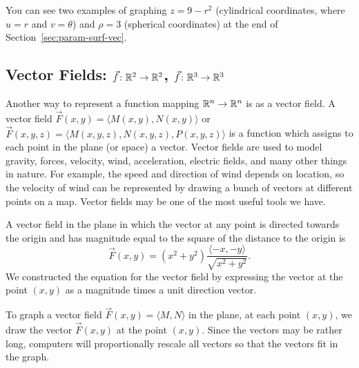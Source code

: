 You can see two examples of graphing $z=9-r^2$ (cylindrical
coordinates, where $u=r$ and $v=\theta$) and $\rho=3$ (spherical
coordinates) at the end of Section~\ref{sec:param-surf-vec}.

\subsection{Vector Fields: {$\vec f\colon \mathbb{R}^2\to \mathbb{R}^2$}, {$\vec f\colon \mathbb{R}^3\to \mathbb{R}^3$}}
Another way to represent a function mapping $\mathbb{R}^n\to\mathbb{R}^n$ is as a
vector field.  A vector field $\vec F(x,y) = \langle
M(x,y),N(x,y)\rangle$ or $\vec F(x,y,z) = \langle
M(x,y,z),N(x,y,z),P(x,y,z) \rangle$ is a function which assigns to
each point in the plane (or space) a vector.  Vector fields are used
to model gravity, forces, velocity, wind, acceleration, electric
fields, and many other things in nature. For example, the speed and
direction of wind depends on location, so the velocity of wind can be
represented by drawing a bunch of vectors at different points on a
map.  Vector fields may be one of the most useful tools we have.

\begin{example} 
A vector field in the plane in which the vector at any
point is directed towards the origin and has magnitude equal to the
square of the distance to the origin is
$$\vec F(x,y) =
(x^2+y^2)\frac{\langle-x,-y\rangle}{\sqrt{x^2+y^2}}.$$ We constructed
the equation for the vector field by expressing the vector at the
point $(x,y)$ as a magnitude times a unit direction vector.  
\end{example}

To graph a vector field $\vec F(x,y) = \langle M,N\rangle$ in the
plane, at each point $(x,y)$, we draw the vector $\vec F(x,y)$ at the
point $(x,y)$. Since the vectors may be rather long, computers will
proportionally rescale all vectors so that the vectors fit in the
graph.

